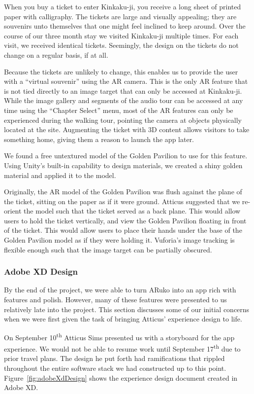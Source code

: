 \documentclass[a4paper, 10pt, american, titlepage]{article}
\begin{document}
When you buy a ticket to enter Kinkaku-ji, you receive a long sheet of
printed paper with calligraphy. The tickets are large and visually appealing;
they are souvenirs unto themselves that one might feel inclined to keep
around. Over the course of our three month stay we visited Kinkaku-ji
multiple times. For each visit, we received identical tickets. Seemingly, the
design on the tickets do not change on a regular basis, if at all.

Because the tickets are unlikely to change, this enables us to provide the
user with a ``virtual souvenir'' using the AR camera. This is the only AR
feature that is not tied directly to an image target that can only be
accessed at Kinkaku-ji. While the image gallery and segments of the audio
tour can be accessed at any time using the ``Chapter Select'' menu, most of
the AR features can only be experienced during the walking tour, pointing the
camera at objects physically located at the site. Augmenting the ticket
with 3D content allows visitors to take something home, giving them a reason
to launch the app later.

We found a free untextured model of the Golden Pavilion to use for this
feature. Using Unity's built-in capability to design materials, we created
a shiny golden material and applied it to the model.

Originally, the AR model of the Golden Pavilion was flush against the plane
of the ticket, sitting on the paper as if it were ground. Atticus suggested
that we re-orient the model such that the ticket served as a back plane. This
would allow users to hold the ticket vertically, and view the Golden Pavilion
floating in front of the ticket. This would allow users to place their hands
under the base of the Golden Pavilion model as if they were holding it.
Vuforia's image tracking is flexible enough such that the image target can be
partially obscured.

\subsubsection{Adobe XD Design}
\label{sec:adobeXdDesign}

By the end of the project, we were able to turn ARuko into an app rich with
features and polish. However, many of these features were presented to us
relatively late into the project. This section discusses some of our initial
concerns when we were first given the task of bringing Atticus' experience
design to life.

On September 10\textsuperscript{th} Atticus Sims presented us with a storyboard
for the app experience. We would not be able to resume work until September
17\textsuperscript{th} due to prior travel plans. The design he put forth had
ramifications that rippled throughout the entire software stack we had
constructed up to this point.  Figure~\ref{fig:adobeXdDesign} shows the experience
design document created in Adobe XD.
\end{document}
